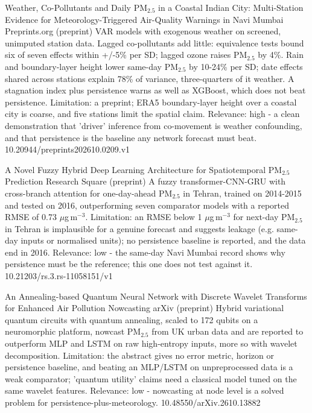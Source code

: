 \documentclass[10pt]{article}
\begin{document}
{Weather, Co-Pollutants and Daily PM$_{2.5}$ in a Coastal Indian City: Multi-Station Evidence for Meteorology-Triggered Air-Quality Warnings in Navi Mumbai}
{Preprints.org (preprint)}
{VAR models with exogenous weather on screened, unimputed station data. Lagged co-pollutants add little: equivalence tests bound six of seven effects within +/-5\% per SD; lagged ozone raises PM$_{2.5}$ by 4\%. Rain and boundary-layer height lower same-day PM$_{2.5}$ by 10-24\% per SD; date effects shared across stations explain 78\% of variance, three-quarters of it weather. A stagnation index plus persistence warns as well as XGBoost, which does not beat persistence. Limitation: a preprint; ERA5 boundary-layer height over a coastal city is coarse, and five stations limit the spatial claim. Relevance: high - a clean demonstration that 'driver' inference from co-movement is weather confounding, and that persistence is the baseline any network forecast must beat.}
{10.20944/preprints202610.0209.v1}

{A Novel Fuzzy Hybrid Deep Learning Architecture for Spatiotemporal PM$_{2.5}$ Prediction}
{Research Square (preprint)}
{A fuzzy transformer-CNN-GRU with cross-branch attention for one-day-ahead PM$_{2.5}$ in Tehran, trained on 2014-2015 and tested on 2016, outperforming seven comparator models with a reported RMSE of 0.73 $\mu$g\,m$^{-3}$. Limitation: an RMSE below 1 $\mu$g\,m$^{-3}$ for next-day PM$_{2.5}$ in Tehran is implausible for a genuine forecast and suggests leakage (e.g. same-day inputs or normalised units); no persistence baseline is reported, and the data end in 2016. Relevance: low - the same-day Navi Mumbai record shows why persistence must be the reference; this one does not test against it.}
{10.21203/rs.3.rs-11058151/v1}

{An Annealing-based Quantum Neural Network with Discrete Wavelet Transforms for Enhanced Air Pollution Nowcasting}
{arXiv (preprint)}
{Hybrid variational quantum circuits with quantum annealing, scaled to 172 qubits on a neuromorphic platform, nowcast PM$_{2.5}$ from UK urban data and are reported to outperform MLP and LSTM on raw high-entropy inputs, more so with wavelet decomposition. Limitation: the abstract gives no error metric, horizon or persistence baseline, and beating an MLP/LSTM on unpreprocessed data is a weak comparator; 'quantum utility' claims need a classical model tuned on the same wavelet features. Relevance: low - nowcasting at node level is a solved problem for persistence-plus-meteorology.}
{10.48550/arXiv.2610.13882}
\end{document}
